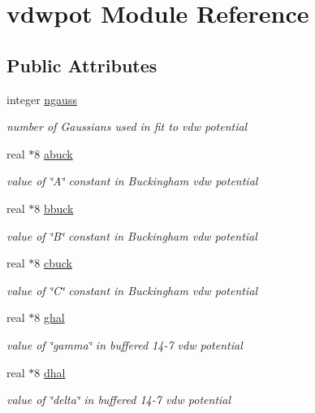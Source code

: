 \hypertarget{classvdwpot}{\section{vdwpot Module Reference}
\label{classvdwpot}
}
\subsection*{Public Attributes}
\begin{DoxyCompactItemize}
\item 
integer \hyperlink{classvdwpot_a3681327bb2cd375923afb9a39eab5d94}{ngauss}
\begin{DoxyCompactList}\small\item\em number of Gaussians used in fit to vdw potential \end{DoxyCompactList}\item 
real $\ast$8 \hyperlink{classvdwpot_a325b92aabfa7050cb0c9288d9ef2e1dc}{abuck}
\begin{DoxyCompactList}\small\item\em value of \char`\"{}\-A\char`\"{} constant in Buckingham vdw potential \end{DoxyCompactList}\item 
real $\ast$8 \hyperlink{classvdwpot_a34541a06361b2acf417096350278d297}{bbuck}
\begin{DoxyCompactList}\small\item\em value of \char`\"{}\-B\char`\"{} constant in Buckingham vdw potential \end{DoxyCompactList}\item 
real $\ast$8 \hyperlink{classvdwpot_a845eb8eaafc343c1d47fcdb0714d697f}{cbuck}
\begin{DoxyCompactList}\small\item\em value of \char`\"{}\-C\char`\"{} constant in Buckingham vdw potential \end{DoxyCompactList}\item 
real $\ast$8 \hyperlink{classvdwpot_a98afcf4416d7bab06175cf40fc553500}{ghal}
\begin{DoxyCompactList}\small\item\em value of \char`\"{}gamma\char`\"{} in buffered 14-\/7 vdw potential \end{DoxyCompactList}\item 
real $\ast$8 \hyperlink{classvdwpot_aa08419cc1dd5ce7068ae0d3064e0edff}{dhal}
\begin{DoxyCompactList}\small\item\em value of \char`\"{}delta\char`\"{} in buffered 14-\/7 vdw potential \end{DoxyCompactList}\item 

\end{DoxyCompactItemize}
